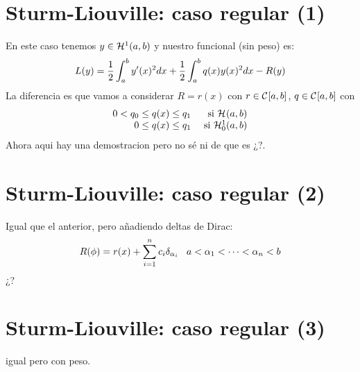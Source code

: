 \section{Sturm-Liouville: caso regular (1)}

En este caso tenemos $y\in\mathcal{H}^{ 1 } (a,b)$ y nuestro funcional (sin peso) es:
\[
L(y)=\frac{1}{2}\displaystyle\int_{ a }^{ b } y'(x)^2dx+\frac{1}{2}\displaystyle\int_{ a }^{ b } q(x)y(x)^2dx-R(y)
\]
La diferencia es que vamos a considerar $R=r(x)$ con $r\in\mathcal{C}^{  }[a,b]$, $q\in\mathcal{C}^{  }[a,b]$ con 
\[
\begin{array}{rr}
0<q_0\leq q(x)\leq q_1 & \text{ si } \mathcal{H}^{  } (a,b)\\
0\leq q(x) \leq q_1    & \text{ si } \mathcal{H}_0^{ 1 } (a,b)
\end{array}
\]
Ahora aqui hay una demostracion  pero no sé ni de que es ¿?.

\section{Sturm-Liouville: caso regular (2)}

Igual que el anterior, pero añadiendo deltas de Dirac:
\[
R(\phi)=r(x)+\sum_{i=1}^nc_i\delta_{\alpha_i} \;\;\; a<\alpha_1<\cdots<\alpha_n<b
\]
¿?

\section{Sturm-Liouville: caso regular (3)}
igual pero con peso.